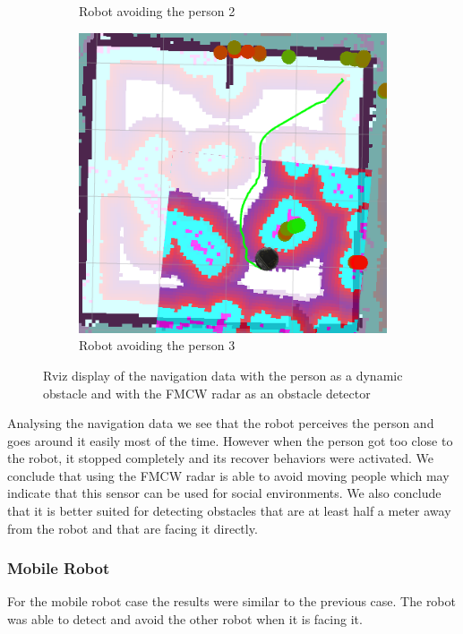 \begin{figure}[ht!]
\begin{subfigure}[t]{0.3\linewidth}
    \caption{Robot avoiding the person 2}
    \label{fig::person2}
  \end{subfigure}
   \begin{subfigure}[t]{0.3\linewidth}
    \includegraphics[width=\linewidth]{imgs/chapter5/person3.png}
    \caption{Robot avoiding the person 3}
    \label{fig::person3}
  \end{subfigure}
  \caption[Navigation data with the person as a dynamic obstacle]{Rviz display of the navigation data with the person as a dynamic obstacle and with the \ac{FMCW} \ac{radar} as an obstacle detector}
  \label{fig:person}
\end{figure}
Analysing the navigation data we see that the robot perceives the person and goes around it easily most of the time.
However when the person got too close to the robot, it stopped completely and its recover behaviors were activated. We conclude that using  the \ac{FMCW} \ac{radar} is able to avoid moving people which may indicate that this sensor can be used for social environments. We also conclude that it is better suited for detecting obstacles that are at least half a meter away from the robot and that are facing it directly. 
\subsubsection{Mobile Robot}
For the mobile robot case the results were similar to the previous case. The robot was able to detect and avoid the other robot when it is facing it.

